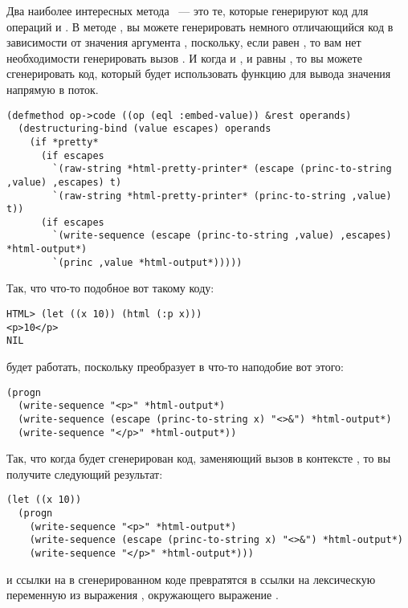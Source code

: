 Два наиболее интересных метода ~--- это те, которые генерируют код для
операций  и .  В методе , вы
можете генерировать немного отличающийся код в зависимости от значения аргумента
, поскольку, если  равен , то вам нет необходимости
генерировать вызов .  И когда и , и  равны
, то вы можете сгенерировать код, который будет использовать функцию
 для вывода значения напрямую в поток.

\begin{lstlisting}
(defmethod op->code ((op (eql :embed-value)) &rest operands)
  (destructuring-bind (value escapes) operands
    (if *pretty*
      (if escapes
        `(raw-string *html-pretty-printer* (escape (princ-to-string ,value) ,escapes) t)
        `(raw-string *html-pretty-printer* (princ-to-string ,value) t))
      (if escapes
        `(write-sequence (escape (princ-to-string ,value) ,escapes) *html-output*)
        `(princ ,value *html-output*)))))
\end{lstlisting}

Так, что что-то подобное вот такому коду:

\begin{lstlisting}
HTML> (let ((x 10)) (html (:p x)))
<p>10</p>
NIL
\end{lstlisting}

будет работать, поскольку  преобразует  в что-то наподобие вот
этого:

\begin{lstlisting}
(progn
  (write-sequence "<p>" *html-output*)
  (write-sequence (escape (princ-to-string x) "<>&") *html-output*)
  (write-sequence "</p>" *html-output*))
\end{lstlisting}

Так, что когда будет сгенерирован код, заменяющий вызов  в контексте
, то вы получите следующий результат:

\begin{lstlisting}
(let ((x 10))
  (progn
    (write-sequence "<p>" *html-output*)
    (write-sequence (escape (princ-to-string x) "<>&") *html-output*)
    (write-sequence "</p>" *html-output*)))
\end{lstlisting}

и ссылки на  в сгенерированном коде превратятся в ссылки на лексическую переменную
из выражения , окружающего выражение .

